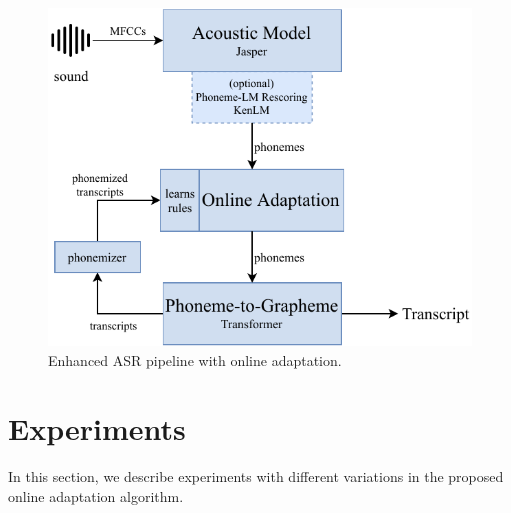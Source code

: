 \begin{figure}[t]
	\centering
	\includegraphics[width=.9\textwidth]{img/online_easr}
	\caption{Enhanced ASR pipeline with online adaptation.}
	\label{fig:online_easr}
\end{figure} 


\section{Experiments}
\label{oeasr:experiments}
In this section, we describe experiments with different variations in the proposed online adaptation algorithm.

